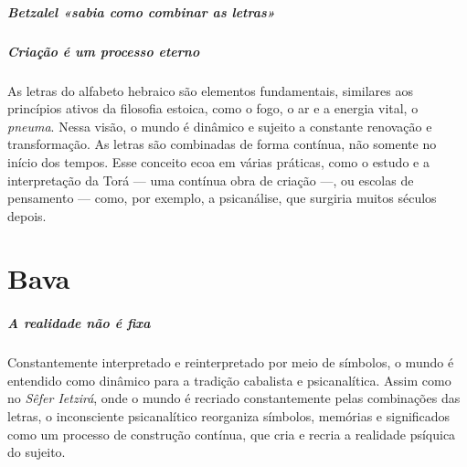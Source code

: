 \paragraph{Betzalel «sabia como combinar as letras»}  

\paragraph{Criação é um processo eterno} As letras do alfabeto hebraico são elementos fundamentais, similares aos princípios ativos da filosofia estoica, como o fogo, o ar e a energia vital, o \textit{pneuma}. Nessa visão, o mundo é dinâmico e sujeito a constante renovação e transformação. As letras são combinadas de forma contínua, não somente no início dos tempos. Esse conceito ecoa em várias práticas, como o estudo e a interpretação da Torá --- uma contínua obra de criação ---, ou escolas de pensamento --- como, por exemplo, a psicanálise, que surgiria muitos séculos depois.

\chapter*{Bava \smallskip{}}

\begin{center}
{\huge{}}
\end{center}

\paragraph{A realidade não é fixa} Constantemente interpretado e reinterpretado por meio de símbolos, o mundo é entendido como dinâmico para a tradição cabalista e psicanalítica. Assim como no \textit{Sêfer Ietzirá}, onde o mundo é recriado constantemente pelas combinações das letras, o inconsciente psicanalítico reorganiza símbolos, memórias e significados como um processo de construção contínua, que cria e recria a realidade psíquica do sujeito. 

